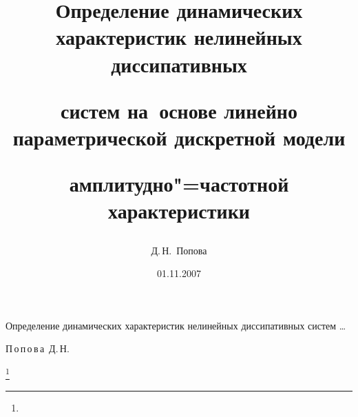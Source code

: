 %





%





\renewcommand{\firstpage}{108} %


\renewcommand{\lastpage}{112} %















\title{Определение динамических характеристик нелинейных диссипативных 


систем на~основе линейно параметрической дискретной модели 


амплитудно"=частотной характеристики} %


      {Определение динамических характеристик нелинейных диссипативных систем \dots} %










\author{Д.\,Н.~Попова}{П\,о\,п\,о\,в\,а~Д.\,Н.}










\date{01.11.2007} %





\thanks{}





\address{\samgtu}











